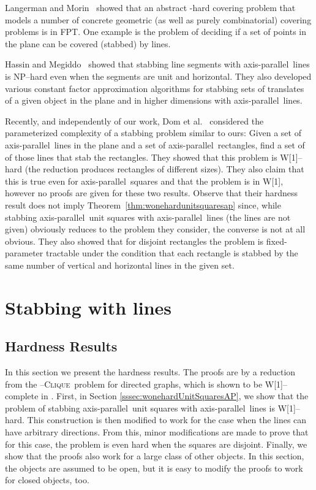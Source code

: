 \documentclass[12pt]{article}
\newcommand{\cclass}[1]{{#1}}
\newcommand{\problem}[1]{\textsc{#1}}
\newcommand{\fpt}{\cclass{FPT}}
\newcommand{\wone}{\cclass{W[1]}}
\newcommand{\clique}{\problem{Clique}}
\newcommand{\ap}{a.p.\ }
\renewcommand{\ap}{axis-parallel\ }
\begin{document}
Langerman and Morin~\cite{DBLP:journals/dcg/LangermanM05} showed that an abstract -hard
covering problem that models a number of concrete geometric (as well as
purely combinatorial) covering problems is in \fpt. One example is the
problem of deciding if a set of  points in the plane can be covered
(stabbed) by  lines.

Hassin and Megiddo~\cite{HM91} showed that stabbing line segments with \ap lines is NP--hard even when the 
segments are unit and horizontal. They also developed various constant factor approximation algorithms
for stabbing sets of translates of a given object in the plane and in higher dimensions with \ap lines.

Recently, and independently of our work, 
Dom et al.~\cite{DFR09} considered the parameterized complexity of a stabbing problem similar to ours:
Given a set of \ap lines in the plane and a set of \ap rectangles, find a set of  of those lines that
stab the rectangles. They showed that this problem is \wone--hard (the reduction produces rectangles of different sizes). 
They also claim that this is true even for \ap squares and 
that the problem is in W[1], however no proofs are given for these two results. Observe that 
their hardness result does not imply Theorem~\ref{thm:wonehardunitsquaresap} since, while stabbing \ap unit squares with \ap lines 
(the lines are not given) obviously reduces to the problem they consider, the converse is not at all obvious.
They also showed that for disjoint rectangles the problem is fixed-parameter tractable under the condition that each rectangle is 
stabbed by the same number of vertical and horizontal lines in the given set.
  






\section{Stabbing with  lines}

\subsection{Hardness Results}\label{section:Hardness}
In this section we present the hardness results. The proofs are by a reduction from the --\clique\ problem for directed graphs, which is shown to be \wone--complete in \cite{DF99}. First, in Section \ref{sssec:wonehardUnitSquaresAP}, we show that the problem of stabbing \ap unit squares with \ap lines is \wone--hard. This construction is then modified to work for the case when the lines can have arbitrary directions. From this, minor modifications are made to prove that for this case, the problem is even hard when the squares are disjoint. Finally, we show that the proofs also work for a large class of other objects. In this section, the objects are assumed to be open, but it is easy to modify the proofs to work for closed objects, too.
\end{document}
